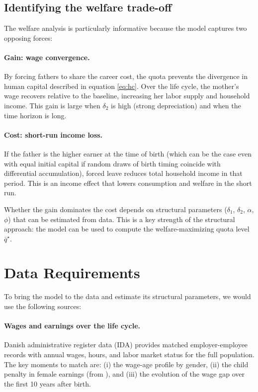 \subsection{Identifying the welfare trade-off}

The welfare analysis is particularly informative because the model captures two opposing forces:

\paragraph{Gain: wage convergence.}
By forcing fathers to share the career cost, the quota prevents the divergence in human capital described in equation \eqref{eq:hc}. Over the life cycle, the mother's wage recovers relative to the baseline, increasing her labor supply and household income. This gain is large when $\delta_2$ is high (strong depreciation) and when the time horizon is long.

\paragraph{Cost: short-run income loss.}
If the father is the higher earner at the time of birth (which can be the case even with equal initial capital if random draws of birth timing coincide with differential accumulation), forced leave reduces total household income in that period. This is an income effect that lowers consumption and welfare in the short run.

Whether the gain dominates the cost depends on structural parameters ($\delta_1$, $\delta_2$, $\alpha$, $\phi$) that can be estimated from data. This is a key strength of the structural approach: the model can be used to compute the welfare-maximizing quota level $\bar{q}^\star$.

\section{Data Requirements}

To bring the model to the data and estimate its structural parameters, we would use the following sources:

\paragraph{Wages and earnings over the life cycle.}
Danish administrative register data (IDA) provides matched employer-employee records with annual wages, hours, and labor market status for the full population. The key moments to match are: (i) the wage-age profile by gender, (ii) the child penalty in female earnings (from \citet{kleven2019children}), and (iii) the evolution of the wage gap over the first 10 years after birth.

